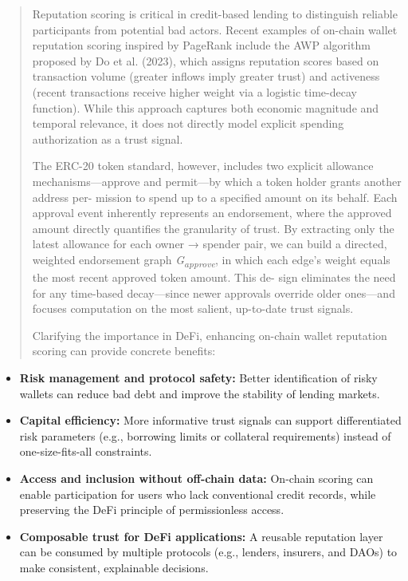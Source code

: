 \documentclass[
]{article}
\begin{document}
\begin{quote}
Reputation scoring is critical in credit-based lending to distinguish reliable participants from potential bad actors. Recent examples of on-chain wallet reputation scoring inspired by PageRank include the AWP algorithm proposed by Do et al. (2023), which assigns reputation scores based on transaction volume (greater inflows imply greater trust) and activeness (recent transactions receive higher weight via a logistic time-decay function). While this approach captures both economic magnitude and temporal relevance, it does not directly model explicit spending authorization as a trust signal.

The ERC-20 token standard, however, includes two explicit allowance mechanisms---approve and permit---by which a token holder grants another address per- mission to spend up to a specified amount on its behalf. Each approval event inherently represents an endorsement, where the approved amount directly quantifies the granularity of trust. By extracting only the latest allowance for each owner → spender pair, we can build a directed, weighted endorsement graph \emph{G\textsubscript{approve}}, in which each edge's weight equals the most recent approved token amount. This de- sign eliminates the need for any time-based decay---since newer approvals override older ones---and focuses computation on the most salient, up-to-date trust signals.

Clarifying the importance in DeFi, enhancing on-chain wallet reputation scoring can provide concrete benefits:
\end{quote}

\begin{itemize}
\item
  \textbf{Risk management and protocol safety:} Better identification of risky wallets can reduce bad debt and improve the stability of lending markets.
\item
  \textbf{Capital efficiency:} More informative trust signals can support differentiated risk parameters (e.g., borrowing limits or collateral requirements) instead of one-size-fits-all constraints.
\item
  \textbf{Access and inclusion without off-chain data:} On-chain scoring can enable participation for users who lack conventional credit records, while preserving the DeFi principle of permissionless access.
\item
  \textbf{Composable trust for DeFi applications:} A reusable reputation layer can be consumed by multiple protocols (e.g., lenders, insurers, and DAOs) to make consistent, explainable decisions.
\end{itemize}
\end{document}
